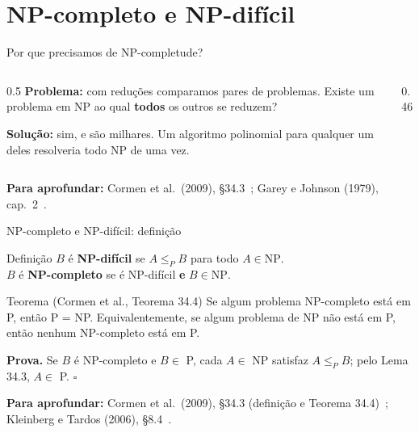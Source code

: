 \documentclass[aspectratio=169,xcolor=table]{beamer}
\newcommand{\fonte}[1]{%
  \vfill
  {\tiny\color{gray!55!black}\textbf{Para aprofundar:} #1\par}%
}
\begin{document}
\section{NP-completo e NP-difícil}

\begin{frame}{Por que precisamos de NP-completude?}
  \begin{columns}[T]
    \begin{column}{0.5\textwidth}
      \textbf{Problema:} com reduções comparamos pares de problemas. Existe um problema em NP
      ao qual \textbf{todos} os outros se reduzem?
      \medskip

      \textbf{Solução:} sim, e são milhares. Um algoritmo polinomial para qualquer um deles
      resolveria todo NP de uma vez.
    \end{column}
    \begin{column}{0.46\textwidth}
      \begin{center}
      \end{center}
    \end{column}
  \end{columns}
  \fonte{Cormen et al.\ (2009), \S 34.3~\cite{cormen2009introduction};
    Garey e Johnson (1979), cap.~2~\cite{garey1979computers}.}
\end{frame}

\begin{frame}{NP-completo e NP-difícil: definição}
  \begin{block}{Definição}
    \small
    $B$ é \textbf{NP-difícil} se $A \le_P B$ para todo $A \in \mathrm{NP}$.\\
    $B$ é \textbf{NP-completo} se é NP-difícil \textbf{e} $B \in \mathrm{NP}$.
  \end{block}
  \begin{exampleblock}{Teorema (Cormen et al., Teorema 34.4)}
    \small
    Se algum problema NP-completo está em P, então P = NP. Equivalentemente, se algum
    problema de NP não está em P, então nenhum NP-completo está em P.
  \end{exampleblock}
  \scriptsize
  \textbf{Prova.} Se $B$ é NP-completo e $B \in$ P, cada $A \in$ NP satisfaz $A \le_P B$;
  pelo Lema 34.3, $A \in$ P. \hfill$\square$
  \fonte{Cormen et al.\ (2009), \S 34.3 (definição e Teorema 34.4)~\cite{cormen2009introduction};
    Kleinberg e Tardos (2006), \S 8.4~\cite{kleinberg2006algorithm}.}
\end{frame}
\end{document}
